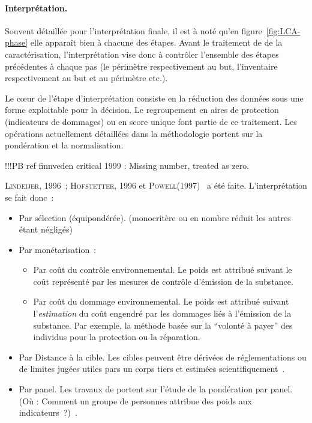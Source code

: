 \paragraph{Interprétation.}
Souvent détaillée pour l'interprétation finale, il est à noté qu'en figure~\ref{fig:LCA-phase} elle apparaît bien à chacune des étapes.
Avant le traitement de de la caractérisation, l'interprétation vise donc à contrôler l'ensemble des étapes précédentes à chaque pas (le périmètre respectivement au but, l'inventaire respectivement au but et au périmètre etc.).

Le cœur de l'étape d'interprétation consiste en la réduction des données sous une forme exploitable pour la décision.
Le regroupement en aires de protection (indicateurs de dommages) ou en score unique font partie de ce traitement.
Les opérations actuellement détaillées dans la méthodologie portent sur la pondération et la normalisation.

!!!PB ref finnveden critical 1999 : Missing number, treated as zero.

 \textsc{Lindeijer}, 1996~; \textsc{Hofstetter}, 1996 et \textsc{Powell}(1997)~\cite{powell_approaches_1997} a été faite.
L'interprétation se fait donc~:
\begin{itemize}
\item Par sélection (équipondérée). (monocritère ou en nombre réduit les autres étant négligés)
\item Par monétarisation~:
\begin{itemize}
\item Par coût du contrôle environnemental. 
Le poids est attribué suivant le coût représenté par les mesures de contrôle d'émission de la substance.
\item Par coût du dommage environnemental.
Le poids est attribué suivant l'\emph{estimation} du coût engendré par les dommages liés à l'émission de la substance.
Par exemple, la méthode basée sur la ``volonté à payer'' des individus pour la protection ou la réparation.%
\end{itemize}
\item Par Distance à la cible. Les cibles peuvent être dérivées de réglementations ou de limites jugées utiles pars un corps tiers et estimées scientifiquement~\cite{seppala_meaning_2001}.
\item Par panel. Les travaux de \citeauthor{myllyviita_impact_2014} portent sur l'étude de la pondération par panel. (Où : Comment un groupe de personnes attribue des poids aux indicateurs~?)~\cite{myllyviita_impact_2014}.
\end{itemize}

